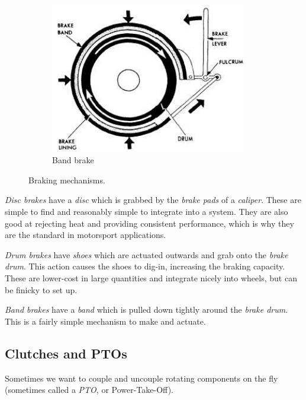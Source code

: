 \documentclass[10pt,letterpaper]{book}
\begin{document}
\begin{figure}[H]
\begin{subfigure}[b]{.32\linewidth}
		\includegraphics[width=0.95\textwidth]{imgs/brake_band.jpeg}
		\caption{Band brake}
	\end{subfigure}
	\caption{Braking mechanisms.}
\end{figure}

\begin{asparaenum}[a)]
	\item \textit{Disc brakes} have a \textit{disc} which is grabbed by the \textit{brake pads} of a \textit{caliper}. These are simple to find and reasonably simple to integrate into a system. They are also good at rejecting heat and providing consistent performance, which is why they are the standard in motorsport applications.
	\item \textit{Drum brakes} have \textit{shoes} which are actuated outwards and grab onto the \textit{brake drum}. This action causes the shoes to dig-in, increasing the braking capacity. These are lower-cost in large quantities and integrate nicely into wheels, but can be finicky to set up.
	\item \textit{Band brakes} have a \textit{band} which is pulled down tightly around the \textit{brake drum}. This is a fairly simple mechanism to make and actuate. 
\end{asparaenum}


\subsection{Clutches and PTOs}

Sometimes we want to couple and uncouple rotating components on the fly (sometimes called a \textit{PTO}, or Power-Take-Off).
\end{document}
